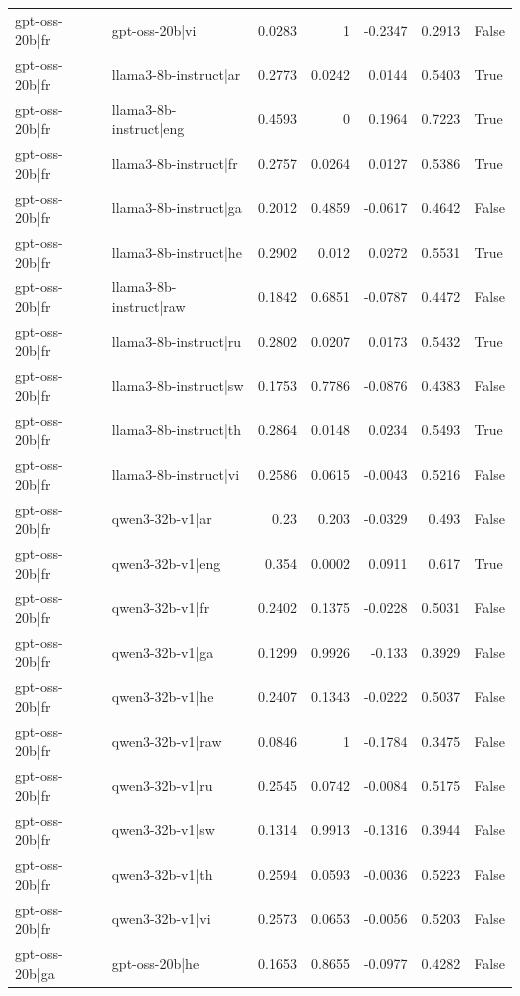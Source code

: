 \begin{table}
\begin{tabular}{l l r r r r l}
gpt-oss-20b|fr & gpt-oss-20b|vi & 0.0283 & 1 & -0.2347 & 0.2913 & False \\
gpt-oss-20b|fr & llama3-8b-instruct|ar & 0.2773 & 0.0242 & 0.0144 & 0.5403 & True \\
gpt-oss-20b|fr & llama3-8b-instruct|eng & 0.4593 & 0 & 0.1964 & 0.7223 & True \\
gpt-oss-20b|fr & llama3-8b-instruct|fr & 0.2757 & 0.0264 & 0.0127 & 0.5386 & True \\
gpt-oss-20b|fr & llama3-8b-instruct|ga & 0.2012 & 0.4859 & -0.0617 & 0.4642 & False \\
gpt-oss-20b|fr & llama3-8b-instruct|he & 0.2902 & 0.012 & 0.0272 & 0.5531 & True \\
gpt-oss-20b|fr & llama3-8b-instruct|raw & 0.1842 & 0.6851 & -0.0787 & 0.4472 & False \\
gpt-oss-20b|fr & llama3-8b-instruct|ru & 0.2802 & 0.0207 & 0.0173 & 0.5432 & True \\
gpt-oss-20b|fr & llama3-8b-instruct|sw & 0.1753 & 0.7786 & -0.0876 & 0.4383 & False \\
gpt-oss-20b|fr & llama3-8b-instruct|th & 0.2864 & 0.0148 & 0.0234 & 0.5493 & True \\
gpt-oss-20b|fr & llama3-8b-instruct|vi & 0.2586 & 0.0615 & -0.0043 & 0.5216 & False \\
gpt-oss-20b|fr & qwen3-32b-v1|ar & 0.23 & 0.203 & -0.0329 & 0.493 & False \\
gpt-oss-20b|fr & qwen3-32b-v1|eng & 0.354 & 0.0002 & 0.0911 & 0.617 & True \\
gpt-oss-20b|fr & qwen3-32b-v1|fr & 0.2402 & 0.1375 & -0.0228 & 0.5031 & False \\
gpt-oss-20b|fr & qwen3-32b-v1|ga & 0.1299 & 0.9926 & -0.133 & 0.3929 & False \\
gpt-oss-20b|fr & qwen3-32b-v1|he & 0.2407 & 0.1343 & -0.0222 & 0.5037 & False \\
gpt-oss-20b|fr & qwen3-32b-v1|raw & 0.0846 & 1 & -0.1784 & 0.3475 & False \\
gpt-oss-20b|fr & qwen3-32b-v1|ru & 0.2545 & 0.0742 & -0.0084 & 0.5175 & False \\
gpt-oss-20b|fr & qwen3-32b-v1|sw & 0.1314 & 0.9913 & -0.1316 & 0.3944 & False \\
gpt-oss-20b|fr & qwen3-32b-v1|th & 0.2594 & 0.0593 & -0.0036 & 0.5223 & False \\
gpt-oss-20b|fr & qwen3-32b-v1|vi & 0.2573 & 0.0653 & -0.0056 & 0.5203 & False \\
gpt-oss-20b|ga & gpt-oss-20b|he & 0.1653 & 0.8655 & -0.0977 & 0.4282 & False \\

\end{tabular}
\end{table}
